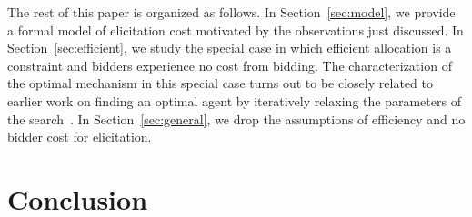 \documentclass{aamas2013}
\begin{document}
The rest of this paper is organized as follows.  In
Section~\ref{sec:model}, we provide a formal model of elicitation cost
motivated by the observations just discussed.  In
Section~\ref{sec:efficient}, we study the special case in which efficient
allocation is a constraint and bidders experience no cost from bidding.
The characterization of the optimal mechanism in this special case turns
out to be closely related to earlier work on finding an optimal agent by
iteratively relaxing the parameters of the search~\cite{}.  In
Section~\ref{sec:general}, we drop the assumptions of efficiency and no
bidder cost for elicitation.















\section{Conclusion}




\end{document}
